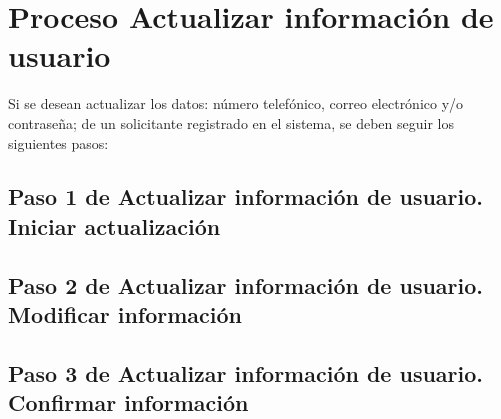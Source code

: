 \chapter{Proceso Actualizar información de usuario}
	Si se desean actualizar los datos: número telefónico, correo 
	electrónico y/o contraseña; de un solicitante registrado en
	el sistema, se deben seguir los siguientes pasos: 
	
\section{Paso 1 de Actualizar información de usuario. 
	Iniciar actualización}
	

\section{Paso 2 de Actualizar información de usuario. 
		Modificar información}
	

\section{Paso 3 de Actualizar información de usuario. 
		Confirmar información}
	

